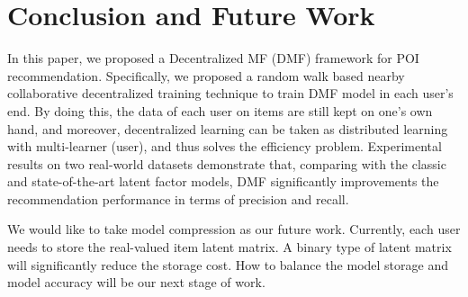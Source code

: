 \section{Conclusion and Future Work}

In this paper, we proposed a Decentralized MF (DMF) framework for POI recommendation. 
Specifically, we proposed a random walk based nearby collaborative decentralized training technique to train DMF model in each user's end. 
By doing this, the data of each user on items are still kept on one's own hand, and moreover, decentralized learning can be taken as distributed learning with multi-learner (user), and thus solves the efficiency problem. 
Experimental results on two real-world datasets demonstrate that, comparing with the classic and state-of-the-art latent factor models, DMF significantly improvements the recommendation performance in terms of precision and recall. 

We would like to take model compression as our future work. 
Currently, each user needs to store the real-valued item latent matrix. %
A binary type of latent matrix will significantly reduce the storage cost. 
How to balance the model storage and model accuracy will be our next stage of work. 

